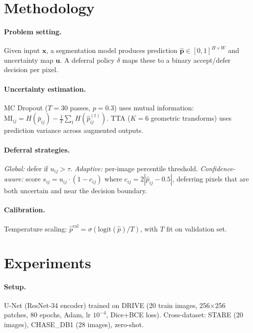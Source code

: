 \documentclass[runningheads]{llncs}
\begin{document}
\section{Methodology}

\paragraph{Problem setting.} Given input $\mathbf{x}$, a segmentation model
produces prediction $\hat{\mathbf{p}} \in [0,1]^{H \times W}$ and uncertainty
map $\mathbf{u}$. A deferral policy $\delta$ maps these to a binary accept/defer
decision per pixel.

\paragraph{Uncertainty estimation.} MC Dropout ($T = 30$ passes, $p = 0.3$)
uses mutual information: $\text{MI}_{ij} = H(\bar{p}_{ij}) - \frac{1}{T}
\sum_t H(\hat{p}_{ij}^{(t)})$. TTA ($K = 6$ geometric transforms) uses
prediction variance across augmented outputs.

\paragraph{Deferral strategies.} \emph{Global:} defer if $u_{ij} > \tau$.
\emph{Adaptive:} per-image percentile threshold. \emph{Confidence-aware:}
score $s_{ij} = u_{ij} \cdot (1 - c_{ij})$ where $c_{ij} = 2|\hat{p}_{ij}
- 0.5|$, deferring pixels that are both uncertain and near the decision
boundary.

\paragraph{Calibration.} Temperature scaling: $\hat{p}^{\text{cal}} =
\sigma(\text{logit}(\hat{p}) / T)$, with $T$ fit on validation set.

\section{Experiments}

\paragraph{Setup.} U-Net (ResNet-34 encoder) trained on DRIVE (20 train images,
256$\times$256 patches, 80 epochs, Adam, lr $10^{-4}$, Dice+BCE loss).
Cross-dataset: STARE (20 images), CHASE\_DB1 (28 images), zero-shot.
\end{document}
